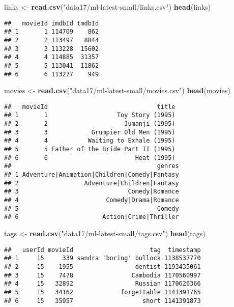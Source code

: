 \documentclass[]{book}
\newenvironment{Shaded}{\begin{snugshade}}{\end{snugshade}}
\newcommand{\KeywordTok}[1]{\textcolor[rgb]{0.13,0.29,0.53}{\textbf{{#1}}}}
\newcommand{\StringTok}[1]{\textcolor[rgb]{0.31,0.60,0.02}{{#1}}}
\newcommand{\NormalTok}[1]{{#1}}
\theoremstyle{definition}
\theoremstyle{definition}
\theoremstyle{definition}
\theoremstyle{remark}
\begin{document}
\begin{Shaded}
\begin{Highlighting}[]
\NormalTok{links <-}\StringTok{ }\KeywordTok{read.csv}\NormalTok{(}\StringTok{"data17/ml-latest-small/links.csv"}\NormalTok{)}
\KeywordTok{head}\NormalTok{(links)}
\end{Highlighting}
\end{Shaded}

\begin{verbatim}
##   movieId imdbId tmdbId
## 1       1 114709    862
## 2       2 113497   8844
## 3       3 113228  15602
## 4       4 114885  31357
## 5       5 113041  11862
## 6       6 113277    949
\end{verbatim}

\begin{Shaded}
\begin{Highlighting}[]
\NormalTok{movies <-}\StringTok{ }\KeywordTok{read.csv}\NormalTok{(}\StringTok{"data17/ml-latest-small/movies.csv"}\NormalTok{)}
\KeywordTok{head}\NormalTok{(movies)}
\end{Highlighting}
\end{Shaded}

\begin{verbatim}
##   movieId                              title
## 1       1                   Toy Story (1995)
## 2       2                     Jumanji (1995)
## 3       3            Grumpier Old Men (1995)
## 4       4           Waiting to Exhale (1995)
## 5       5 Father of the Bride Part II (1995)
## 6       6                        Heat (1995)
##                                        genres
## 1 Adventure|Animation|Children|Comedy|Fantasy
## 2                  Adventure|Children|Fantasy
## 3                              Comedy|Romance
## 4                        Comedy|Drama|Romance
## 5                                      Comedy
## 6                       Action|Crime|Thriller
\end{verbatim}

\begin{Shaded}
\begin{Highlighting}[]
\NormalTok{tags <-}\StringTok{ }\KeywordTok{read.csv}\NormalTok{(}\StringTok{"data17/ml-latest-small/tags.csv"}\NormalTok{)}
\KeywordTok{head}\NormalTok{(tags)}
\end{Highlighting}
\end{Shaded}

\begin{verbatim}
##   userId movieId                     tag  timestamp
## 1     15     339 sandra 'boring' bullock 1138537770
## 2     15    1955                 dentist 1193435061
## 3     15    7478                Cambodia 1170560997
## 4     15   32892                 Russian 1170626366
## 5     15   34162             forgettable 1141391765
## 6     15   35957                   short 1141391873
\end{verbatim}
\end{document}
